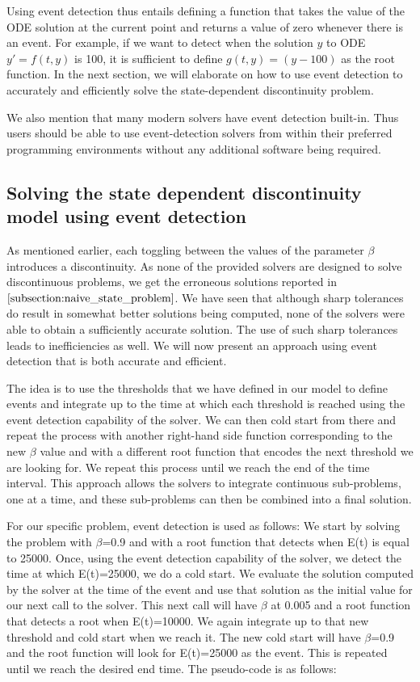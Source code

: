 Using event detection thus entails defining a function that takes the value of the ODE solution at the current point and returns a value of zero whenever there is an event. For example, if we want to detect when the solution $y$ to ODE $y'=f(t, y)$ is 100, it is sufficient to define $g(t, y) = (y - 100)$ as the root function. In the next section, we will elaborate on how to use event detection to accurately and efficiently solve the state-dependent discontinuity problem.

We also mention that many modern solvers have event detection built-in. Thus users should be able to use event-detection solvers from within their preferred programming environments without any additional software being required.

\subsection{Solving the state dependent discontinuity model using event detection}
\label{subsection:state_with_event_detection}
As mentioned earlier, each toggling between the values of the parameter $\beta$ introduces a discontinuity. As none of the provided solvers are designed to solve discontinuous problems, we get the erroneous solutions reported in $\ref{subsection:naive_state_problem}$. We have seen that although sharp tolerances do result in somewhat better solutions being computed, none of the solvers were able to obtain a sufficiently accurate solution. The use of such sharp tolerances leads to inefficiencies as well. We will now present an approach using event detection that is both accurate and efficient.

The idea is to use the thresholds that we have defined in our model to define events and integrate up to the time at which each threshold is reached using the event detection capability of the solver. We can then cold start from there and repeat the process with another right-hand side function corresponding to the new $\beta$ value and with a different root function that encodes the next threshold we are looking for. We repeat this process until we reach the end of the time interval. This approach allows the solvers to integrate continuous sub-problems, one at a time, and these sub-problems can then be combined into a final solution.

For our specific problem, event detection is used as follows:
We start by solving the problem with $\beta$=0.9 and with a root function that detects when E(t) is equal to 25000. Once, using the event detection capability of the solver, we detect the time at which E(t)=25000, we do a cold start. We evaluate the solution computed by the solver at the time of the event and use that solution as the initial value for our next call to the solver. This next call will have $\beta$ at 0.005 and a root function that detects a root when E(t)=10000. We again integrate up to that new threshold and cold start when we reach it. The new cold start will have $\beta$=0.9 and the root function will look for E(t)=25000 as the event. This is repeated until we reach the desired end time. The pseudo-code is as follows:

